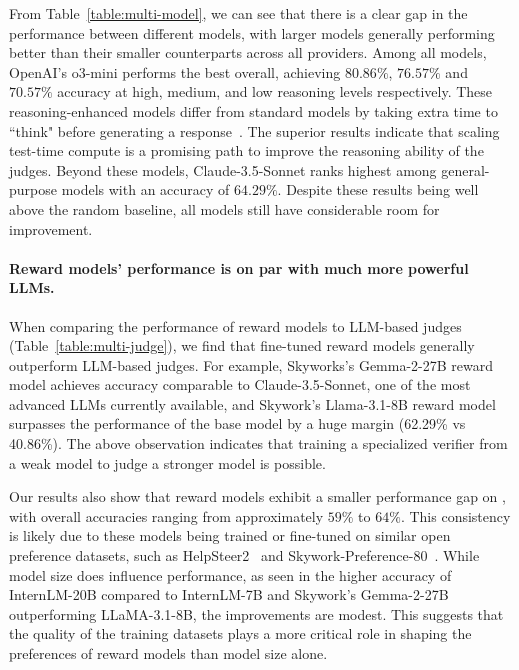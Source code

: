 \documentclass{article} %
\begin{document}
From Table~\ref{table:multi-model}, we can see that there is a clear gap in the performance between different models, with larger models generally performing better than their smaller counterparts across all providers. Among all models, OpenAI's o3-mini performs the best overall, achieving $80.86\%$, $76.57\%$ and $70.57\%$ accuracy at high, medium, and low reasoning levels respectively. These reasoning-enhanced models differ from standard models by taking extra time to ``think" before generating a response~\citep{openai_reasoning_2024}. The superior results indicate that scaling test-time compute is a promising path to improve the reasoning ability of the judges. Beyond these models, Claude-3.5-Sonnet ranks highest among general-purpose models with an accuracy of $64.29\%$. Despite these results being well above the random baseline, all models still have considerable room for improvement.


\paragraph{Reward models' performance is on par with much more powerful LLMs.} When comparing the performance of reward models to LLM-based judges (Table~\ref{table:multi-judge}), we find that fine-tuned reward models generally outperform LLM-based judges. For example, Skyworks's Gemma-2-27B reward model achieves accuracy comparable to Claude-3.5-Sonnet, one of the most advanced LLMs currently available, and Skywork's Llama-3.1-8B reward model surpasses the performance of the base model by a huge margin (62.29\% vs 40.86\%). The above observation indicates that training a specialized verifier from a weak model to judge a stronger model is possible. 

Our results also show that reward models exhibit a smaller performance gap on \sys, with overall accuracies ranging from approximately $59\%$ to $64\%$. This consistency is likely due to these models being trained or fine-tuned on similar open preference datasets, such as HelpSteer2~\citep{wang2024helpsteer2} and Skywork-Preference-80~\citep{skywork-preference}. While model size does influence performance, as seen in the higher accuracy of InternLM-20B compared to InternLM-7B and Skywork's Gemma-2-27B outperforming LLaMA-3.1-8B, the improvements are modest. This suggests that the quality of the training datasets plays a more critical role in shaping the preferences of reward models than model size alone.
\end{document}
